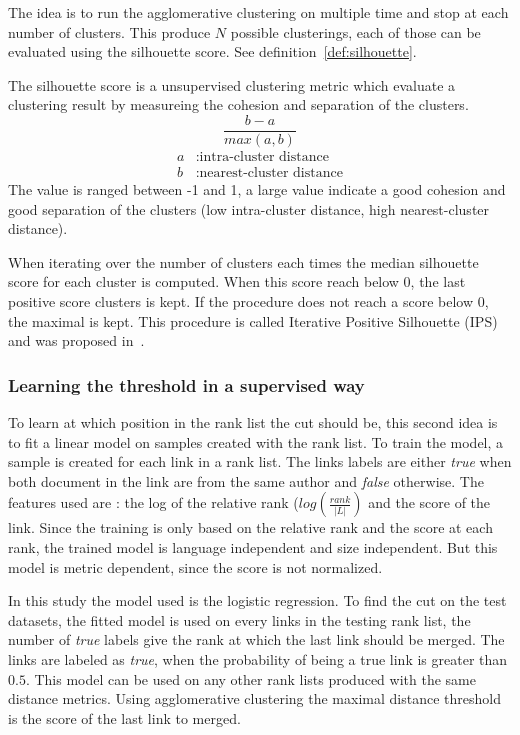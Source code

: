 The idea is to run the agglomerative clustering on multiple time and stop at each number of clusters.
This produce $N$ possible clusterings, each of those can be evaluated using the silhouette score.
See definition~\ref{def:silhouette}.

\begin{definition}
  \label{def:silhouette}
  The silhouette score is a unsupervised clustering metric which evaluate a clustering result by measureing the cohesion and separation of the clusters.
  \begin{equation}
    \frac{b - a}{max(a, b)}
  \end{equation}
  \begin{equation*}
    \begin{split}
      a&: \text{intra-cluster distance}\\
      b&: \text{nearest-cluster distance}
    \end{split}
  \end{equation*}
  The value is ranged between -1 and 1, a large value indicate a good cohesion and good separation of the clusters (low intra-cluster distance, high nearest-cluster distance).
\end{definition}

When iterating over the number of clusters each times the median silhouette score for each cluster is computed.
When this score reach below 0, the last positive score clusters is kept.
If the procedure does not reach a score below 0, the maximal is kept.
This procedure is called Iterative Positive Silhouette (IPS) and was proposed in~\cite{automated_unsupervised}.

\subsubsection{Learning the threshold in a supervised way}

To learn at which position in the rank list the cut should be, this second idea is to fit a linear model on samples created with the rank list.
To train the model, a sample is created for each link in a rank list.
The links labels are either \textit{true} when both document in the link are from the same author and \textit{false} otherwise.
The features used are : the log of the relative rank ($log(\frac{rank}{|L|})$ and the score of the link.
Since the training is only based on the relative rank and the score at each rank, the trained model is language independent and size independent.
But this model is metric dependent, since the score is not normalized.

In this study the model used is the logistic regression.
To find the cut on the test datasets, the fitted model is used on every links in the testing rank list, the number of \textit{true} labels give the rank at which the last link should be merged.
The links are labeled as \textit{true}, when the probability of being a true link is greater than $0.5$.
This model can be used on any other rank lists produced with the same distance metrics.
Using agglomerative clustering the maximal distance threshold is the score of the last link to merged.
